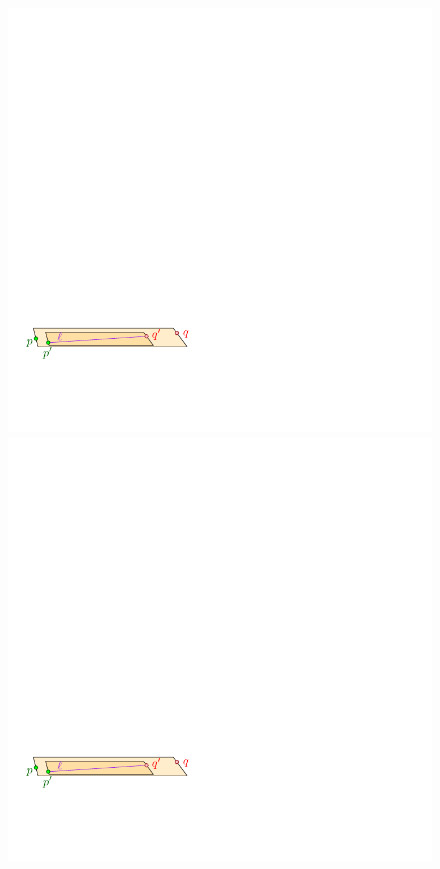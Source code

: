 \documentclass[12pt]{article}%
\begin{document}
\begin{figure}[h]
    \phantom{}\hfill%
    \includegraphics{figs/narrow_trap}%
    \hfill%
    \includegraphics[page=2]{figs/narrow_trap}%

\end{figure}
\end{document}
